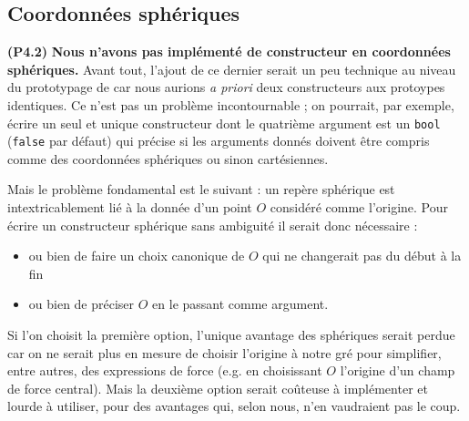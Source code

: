\documentclass[12pt, letterpaper, twoside]{article}
\newcommand{\T}[1]{\texttt{#1}}
\begin{document}
\subsection{Coordonnées sphériques}
\noindent \textbf{(P4.2)} \textbf{Nous n’avons pas implémenté de constructeur en coordonnées sphériques.} Avant tout, l’ajout de ce dernier serait un peu technique au niveau du prototypage de car nous aurions \textit{a priori} deux constructeurs aux protoypes identiques. Ce n'est pas un problème incontournable ; on pourrait, par exemple, écrire un seul et unique constructeur dont le quatrième argument est un \T{bool} (\T{false} par défaut) qui précise si les arguments donnés doivent être compris comme des coordonnées sphériques ou sinon cartésiennes.

Mais le problème fondamental est le suivant : un repère sphérique est intextricablement lié à la donnée d'un point $O$ considéré comme l'origine. Pour écrire un constructeur sphérique sans ambiguité il serait donc nécessaire :
\begin{itemize}
\item ou bien de faire un choix canonique de $O$ qui ne changerait pas du début à la fin
\item ou bien de préciser $O$ en le passant comme argument.
\end{itemize}
Si l'on choisit la première option, l'unique avantage des sphériques serait perdue car on ne serait plus en mesure de choisir l'origine à notre gré pour simplifier, entre autres, des expressions de force (e.g. en choisissant $O$ l'origine d'un champ de force central). Mais la deuxième option serait coûteuse à implémenter et lourde à utiliser, pour des avantages qui, selon nous, n'en vaudraient pas le coup.
\end{document}
